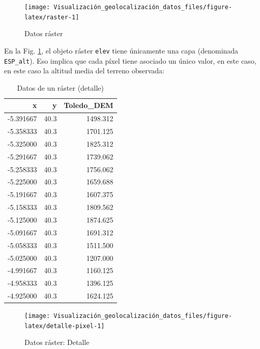 \documentclass[
]{book}
\theoremstyle{definition}
\theoremstyle{definition}
\theoremstyle{definition}
\theoremstyle{definition}
\theoremstyle{remark}
\begin{document}
\begin{figure}

{\centering \texttt{[image: Visualización\_geolocalización\_datos\_files/figure-latex/raster-1]} 

}

\caption{Datos ráster}\label{fig:raster}
\end{figure}

En la Fig. \ref{fig:raster}, el objeto ráster \texttt{elev} tiene únicamente una capa
(denominada \texttt{ESP\_alt}). Eso implica que cada píxel tiene asociado un único
valor, en este caso, en este caso la altitud media del terreno observada:

\begin{table}

\caption{\label{tab:detalle-pixel}Datos de un ráster (detalle)}
\centering
\begin{tabular}[t]{r|r|r}
\hline
x & y & Toledo\_DEM\\
\hline
-5.391667 & 40.3 & 1498.312\\
\hline
-5.358333 & 40.3 & 1701.125\\
\hline
-5.325000 & 40.3 & 1825.312\\
\hline
-5.291667 & 40.3 & 1739.062\\
\hline
-5.258333 & 40.3 & 1756.062\\
\hline
-5.225000 & 40.3 & 1659.688\\
\hline
-5.191667 & 40.3 & 1607.375\\
\hline
-5.158333 & 40.3 & 1809.562\\
\hline
-5.125000 & 40.3 & 1874.625\\
\hline
-5.091667 & 40.3 & 1691.312\\
\hline
-5.058333 & 40.3 & 1511.500\\
\hline
-5.025000 & 40.3 & 1207.000\\
\hline
-4.991667 & 40.3 & 1160.125\\
\hline
-4.958333 & 40.3 & 1396.125\\
\hline
-4.925000 & 40.3 & 1624.125\\
\hline
\end{tabular}
\end{table}

\begin{figure}

{\centering \texttt{[image: Visualización\_geolocalización\_datos\_files/figure-latex/detalle-pixel-1]} 

}

\caption{Datos ráster: Detalle}\label{fig:detalle-pixel}
\end{figure}
\end{document}
